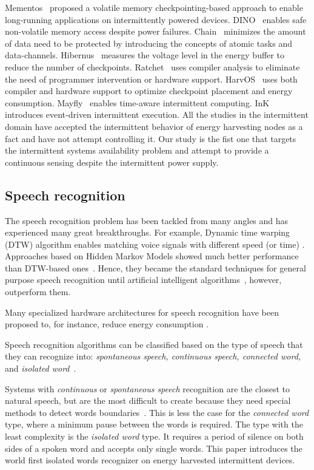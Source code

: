 Mementos~\cite{mementos} proposed a volatile memory checkpointing-based approach to enable long-running applications on intermittently powered devices. DINO~\cite{dino} enables safe non-volatile memory access despite power failures. Chain~\cite{colin2016chain} minimizes the amount of data need to be protected by introducing the concepts of atomic tasks and data-channels. Hibernus~\cite{balsamo2015hibernus} measures the voltage level in the energy buffer to reduce the number of checkpoints. Ratchet~\cite{woude2016ratchet} uses compiler analysis to eliminate the need of programmer intervention or hardware support. HarvOS~\cite{bhatti2017harvos} uses both compiler and hardware support to optimize checkpoint placement and energy consumption. Mayfly~\cite{hester2017timerly} enables time-aware intermittent computing. InK~\cite{yildirim2018ink} introduces event-driven intermittent execution. All the studies in the intermittent domain have accepted the intermittent behavior of energy harvesting nodes as a fact and have not attempt controlling it. Our study is the fist one that targets the intermittent systems availability problem and attempt to provide a continuous sensing despite the intermittent power supply.  

\subsection{Speech recognition}
The speech recognition problem has been tackled from many angles and has experienced many great breakthroughs. For example, Dynamic time warping (DTW) algorithm enables matching voice signals with different speed (or time) \cite{}. Approaches based on Hidden Markov Models showed much better performance than DTW-based ones~\cite{jelinek1997statistical}. Hence, they became the standard techniques for general purpose speech recognition until artificial intelligent algorithms~\cite{hinton2012deep}, however, outperform them. 

Many specialized hardware architectures for speech recognition have been proposed to, for instance, reduce energy consumption \cite{price2018low,price20156}. 

Speech recognition algorithms can be classified based on the type of speech that they can recognize into: \textit{spontaneous speech, continuous speech, connected word,} and \textit{isolated word}~\cite{gaikwad2010review}.

Systems with \textit{continuous} or \textit{spontaneous speech} recognition are the closest to natural speech, but are the most difficult to create because they need special methods to detect words boundaries~\cite{gaikwad2010review}. This is less the case for the \textit{connected word} type, where a minimum pause between the words is required.
 The type with the least complexity is the \textit{isolated word} type. It requires a period of silence on both sides of a spoken word and accepts only single words. This paper introduces the world first isolated words recognizer on energy harvested intermittent devices. 


